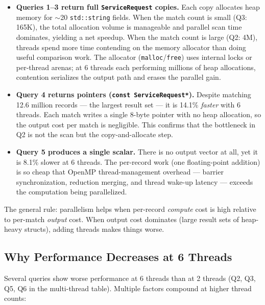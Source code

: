 \documentclass[12pt]{article}
\begin{document}
\begin{itemize}
  \item \textbf{Queries 1--3 return full \texttt{ServiceRequest} copies.}
    Each copy allocates heap memory for $\sim$20 \texttt{std::string} fields.
    When the match count is small (Q3: 165K), the total allocation volume is
    manageable and parallel scan time dominates, yielding a net speedup.
    When the match count is large (Q2: 4M), threads spend more time contending
    on the memory allocator than doing useful comparison work. The allocator
    (\texttt{malloc}/\texttt{free}) uses internal locks or per-thread arenas;
    at 6 threads each performing millions of heap allocations, contention
    serializes the output path and erases the parallel gain.

  \item \textbf{Query 4 returns pointers (\texttt{const ServiceRequest*}).}
    Despite matching 12.6 million records --- the largest result set --- it is
    14.1\% \emph{faster} with 6 threads. Each match writes a single 8-byte
    pointer with no heap allocation, so the output cost per match is
    negligible. This confirms that the bottleneck in Q2 is not the scan but
    the copy-and-allocate step.

  \item \textbf{Query 5 produces a single scalar.}
    There is no output vector at all, yet it is 8.1\% slower at 6 threads.
    The per-record work (one floating-point addition) is so cheap that OpenMP
    thread-management overhead --- barrier synchronization, reduction merging,
    and thread wake-up latency --- exceeds the computation being parallelized.
\end{itemize}

\noindent
The general rule: parallelism helps when per-record \emph{compute} cost is
high relative to per-match \emph{output} cost. When output cost dominates
(large result sets of heap-heavy structs), adding threads makes things worse.

\subsection{Why Performance Decreases at 6 Threads}

Several queries show worse performance at 6 threads than at 2 threads
(Q2, Q3, Q5, Q6 in the multi-thread table). Multiple factors compound at
higher thread counts:
\end{document}

